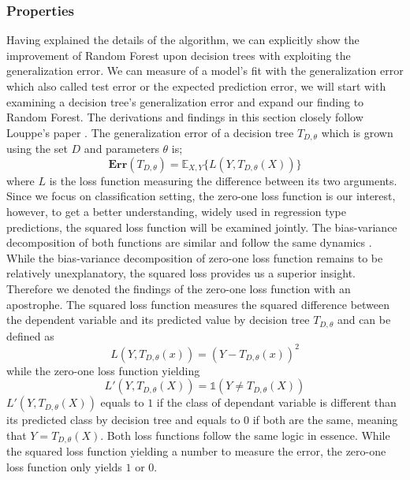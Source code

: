 \subsubsection{Properties}
Having explained the details of the algorithm, we can explicitly show 
the improvement of Random Forest upon decision trees 
with exploiting the generalization error. 
We can measure of a model's fit with the generalization error which also called test error or the expected prediction error, 
we will start with examining a decision tree's generalization error and expand our finding to Random Forest. 
The derivations and findings in this section closely follow Louppe's paper \cite{louppe2014understanding}.
The generalization error of a decision tree $T_{D,\theta}$ which is grown using the set $D$ and parameters $\theta$ is;
\begin{equation}
	\boldsymbol{Err}(T_{D,\theta}) = \mathbb{E}_{X,Y}\{L(Y, T_{D,\theta}(X)) \}
\end{equation}
where $L$ is the loss function measuring the difference between its two arguments. 
Since we focus on classification setting, 
the zero-one loss function is our interest, however, 
to get a better understanding, widely used in regression type predictions, 
the squared loss function will be examined jointly. 
The bias-variance decomposition of both functions are similar and 
follow the same dynamics \cite{domingos2000decomposition}. 
While the bias-variance decomposition of zero-one loss function remains 
to be relatively unexplanatory, the squared loss provides us a superior insight. 
Therefore we denoted the findings of the zero-one loss function with an apostrophe.
The squared loss function measures the squared difference between the dependent variable and its predicted value 
by decision tree $T_{D,\theta}$ and can be defined as
\begin{equation}
	L(Y, T_{D, \theta}(x)) = (Y - T_{D, \theta}(x))^2
\end{equation}
while the zero-one loss function yielding
\begin{equation}
	L'(Y, T_{D,\theta}(X)) = \mathds{1} (Y \neq T_{D, \theta}(X))
\end{equation}
$L'(Y, T_{D,\theta}(X))$ equals to $1$ if the class of dependant variable is 
different than its predicted class by decision tree and equals to 0 if both are the same, 
meaning that $Y = T_{D, \theta}(X)$. 
Both loss functions follow the same logic in essence. 
While the squared loss function yielding a number to measure the error, 
the zero-one loss function only yields $1$ or $0$.
